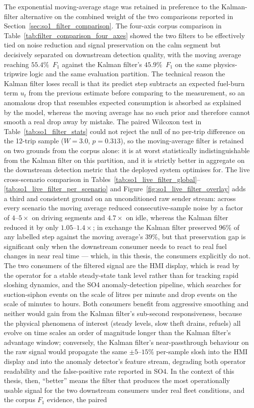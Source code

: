 The exponential moving-average stage was retained in preference to the Kalman-filter alternative on the combined weight of the two comparisons reported in Section~\ref{sec:so1_filter_comparison}. The four-axis corpus comparison in Table~\ref{tab:filter_comparison_four_axes} showed the two filters to be effectively tied on noise reduction and signal preservation on the calm segment but decisively separated on downstream detection quality, with the moving average reaching $55.4\%$~$F_1$ against the Kalman filter's $45.9\%$~$F_1$ on the same physics-tripwire logic and the same evaluation partition. The technical reason the Kalman filter loses recall is that its predict step subtracts an expected fuel-burn term $u_t$ from the previous estimate before comparing to the measurement, so an anomalous drop that resembles expected consumption is absorbed as explained by the model, whereas the moving average has no such prior and therefore cannot smooth a real drop away by mistake. The paired Wilcoxon test in Table~\ref{tab:so1_filter_stats} could not reject the null of no per-trip difference on the 12-trip sample ($W = 3.0$, $p = 0.313$), so the moving-average filter is retained on two grounds from the corpus alone: it is at worst statistically indistinguishable from the Kalman filter on this partition, and it is strictly better in aggregate on the downstream detection metric that the deployed system optimises for. The live cross-scenario comparison in Tables~\ref{tab:so1_live_filter_global}--\ref{tab:so1_live_filter_per_scenario} and Figure~\ref{fig:so1_live_filter_overlay} adds a third and consistent ground on an unconditioned raw sender stream: across every scenario the moving average reduced consecutive-sample noise by a factor of $4$--$5\times$ on driving segments and $4.7\times$ on idle, whereas the Kalman filter reduced it by only $1.05$--$1.4\times$; in exchange the Kalman filter preserved $96\%$ of any labelled step against the moving average's $39\%$, but that preservation gap is significant only when the downstream consumer needs to react to real fuel changes in near real time --- which, in this thesis, the consumers explicitly do not. The two consumers of the filtered signal are the HMI display, which is read by the operator for a stable steady-state tank level rather than for tracking rapid sloshing dynamics, and the SO4 anomaly-detection pipeline, which searches for suction-siphon events on the scale of litres per minute and drop events on the scale of minutes to hours. Both consumers benefit from aggressive smoothing and neither would gain from the Kalman filter's sub-second responsiveness, because the physical phenomena of interest (steady levels, slow theft drains, refuels) all evolve on time scales an order of magnitude longer than the Kalman filter's advantage window; conversely, the Kalman filter's near-passthrough behaviour on the raw signal would propagate the same $\pm 5$--$15\%$ per-sample slosh into the HMI display and into the anomaly detector's feature stream, degrading both operator readability and the false-positive rate reported in SO4. In the context of this thesis, then, ``better'' means the filter that produces the most operationally usable signal for the two downstream consumers under real fleet conditions, and the corpus $F_1$ evidence, the paired 
